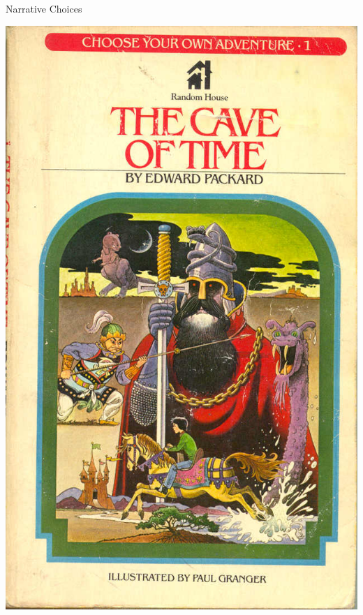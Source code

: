 \documentclass[xcolor=x11names]{beamer}
\begin{document}
\begin{frame}{Narrative Choices}
\begin{center}
  \includegraphics[height=0.8\textheight]{res/cave-of-time-cover.jpg}
  \hspace*{2em}

\end{center}
\end{frame}
\end{document}
